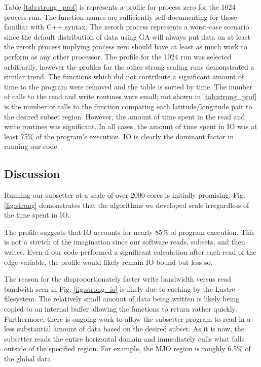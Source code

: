 Table \ref{tab:strong_prof} is represents a profile for process zero for the
1024 process run.  The function names are sufficiently self-documenting for
those familiar with C++ syntax.  The zeroth process represents a worst-case
scenario since the default distribution of data using GA will always put data
on at least the zeroth process implying process zero should have at least as
much work to perform as any other processor.  The profile for the 1024 run was
selected arbitrarily, however the profiles for the other strong scaling runs
demonstrated a similar trend.  The functions which did not contribute a
significant amount of time to the program were removed and the table is sorted
by time.  The number of calls to the read and write routines were small; not
shown in \ref{tab:strong_prof} is the number of calls to the function
comparing each latitude/longitude pair to the desired subset region.  However,
the amount of time spent in the read and write routines was significant.  In
all cases, the amount of time spent in IO was at least 75\% of the program's
execution.  IO is clearly the dominant factor in running our code.

\subsection{Discussion}

Running our subsetter at a scale of over 2000 cores is initially promising.
Fig. \ref{fig:strong} demonstrates that the algorithms we developed scale
irregardless of the time spent in IO.

The profile suggests that IO accounts for nearly 85\% of program execution.
This is not a stretch of the imagination since our software reads, subsets,
and then writes.  Even if our code performed a significant calculation after
each read of the edge variable, the profile would likely remain IO bound but
less so.

The reason for the disproportionately faster write bandwidth versus read
bandwith seen in Fig. \ref{fig:strong_io} is likely due to caching by the
Lustre filesystem.  The relatively small amount of data being written is
likely being copied to an internal buffer allowing the functions to return
rather quickly.  Furthermore, there is ongoing work to allow the subsetter
program to read in a less substantial amount of data based on the desired
subset.  As it is now, the subsetter reads the entire horizontal domain and
immediately culls what falls outside of the specified region.  For example,
the MJO region is roughly 6.5\% of the global data.
